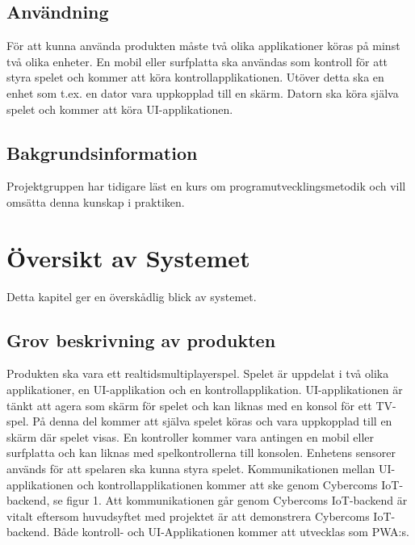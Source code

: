 \documentclass[10pt]{article}
\begin{document}
	\subsection{Användning}
		För att kunna använda produkten måste två olika applikationer köras på minst två olika enheter. En mobil eller surfplatta ska användas som kontroll för att styra spelet och kommer att köra kontrollapplikationen. Utöver detta ska en enhet som t.ex. en dator vara uppkopplad till en skärm. Datorn ska köra själva spelet och kommer att köra UI-applikationen.  
	
	\subsection{Bakgrundsinformation}
		Projektgruppen har tidigare läst en kurs om programutvecklingsmetodik och vill omsätta denna kunskap i praktiken. 
		
\pagebreak
\section{Översikt av Systemet}
	Detta kapitel ger en överskådlig blick av systemet.

	\subsection{Grov beskrivning av produkten}
	Produkten ska vara ett realtidsmultiplayerspel. Spelet är uppdelat i två olika applikationer, en UI-applikation och en kontrollapplikation. UI-applikationen är tänkt att agera som skärm för spelet och kan liknas med en konsol för ett TV-spel. På denna del kommer att själva spelet köras och vara uppkopplad till en skärm där spelet visas. En kontroller kommer vara antingen en mobil eller surfplatta och kan liknas med spelkontrollerna till konsolen. Enhetens sensorer används för att spelaren ska kunna styra spelet. Kommunikationen mellan UI-applikationen och kontrollapplikationen kommer att ske genom Cybercoms IoT-backend, se figur 1. Att kommunikationen går genom Cybercoms IoT-backend är vitalt eftersom huvudsyftet med projektet är att demonstrera Cybercoms IoT-backend.  Både kontroll- och UI-Applikationen kommer att utvecklas som PWA:s. 
	
\end{document}
